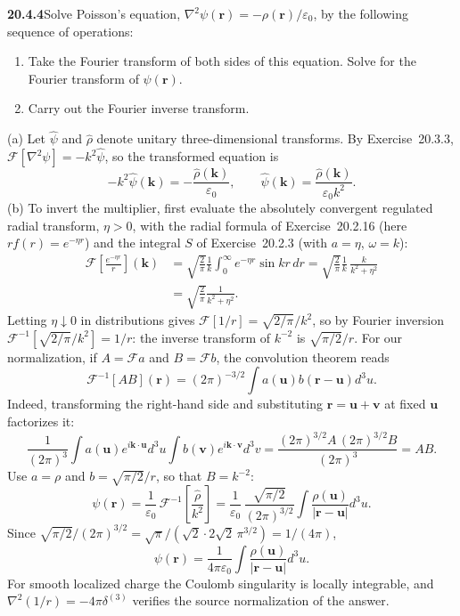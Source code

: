 \par\bigskip
\noindent\textbf{20.4.4}\quad Solve Poisson's equation,
$\nabla^{2}\psi(\mathbf{r})=-\rho(\mathbf{r})/\varepsilon_{0}$, by
the following sequence of operations:
\begin{enumerate}
\item[(a)] Take the Fourier transform of both sides of this
equation. Solve for the Fourier transform of $\psi(\mathbf{r})$.
\item[(b)] Carry out the Fourier inverse transform.
\end{enumerate}
\par{}
\solution
(a) Let $\widehat\psi$ and $\widehat\rho$ denote
unitary three-dimensional transforms. By Exercise~20.3.3,
$\mathcal F[\nabla^2\psi]=-k^2\widehat\psi$, so the transformed
equation is
\[
-k^2\widehat\psi(\mathbf k)=-\frac{\widehat\rho(\mathbf k)}{\varepsilon_0},
\qquad
\widehat\psi(\mathbf k)=\frac{\widehat\rho(\mathbf k)}{\varepsilon_0k^2}.
\]
(b) To invert the multiplier, first evaluate the absolutely
convergent regulated radial transform, $\eta>0$, with the radial
formula of Exercise~20.2.16 (here $rf(r)=e^{-\eta r}$) and the
integral $S$ of Exercise~20.2.3 (with $a=\eta$, $\omega=k$):
\begin{align*}
\mathcal F\left[\frac{e^{-\eta r}}r\right](\mathbf k)
&=\sqrt{\frac2\pi}\frac1k\int_0^\infty e^{-\eta r}\sin kr\,dr
=\sqrt{\frac2\pi}\frac1k\,\frac{k}{k^2+\eta^2}\\
&=\sqrt{\frac2\pi}\frac1{k^2+\eta^2}.
\end{align*}
Letting $\eta\downarrow0$ in distributions gives
$\mathcal F[1/r]=\sqrt{2/\pi}/k^2$, so by Fourier inversion
$\mathcal F^{-1}[\sqrt{2/\pi}/k^2]=1/r$: the
inverse transform of $k^{-2}$ is $\sqrt{\pi/2}/r$.
For our normalization, if $A=\mathcal Fa$ and $B=\mathcal Fb$, the
convolution theorem reads
\[
\mathcal F^{-1}[AB](\mathbf r)
=(2\pi)^{-3/2}\int a(\mathbf u)b(\mathbf r-\mathbf u)d^3u.
\]
Indeed, transforming the right-hand side and substituting
$\mathbf r=\mathbf u+\mathbf v$ at fixed $\mathbf u$ factorizes it:
\[
\frac1{(2\pi)^3}\int a(\mathbf u)e^{i\mathbf k\cdot\mathbf u}d^3u
\int b(\mathbf v)e^{i\mathbf k\cdot\mathbf v}d^3v
=\frac{(2\pi)^{3/2}A\,(2\pi)^{3/2}B}{(2\pi)^3}=AB.
\]
Use $a=\rho$ and $b=\sqrt{\pi/2}/r$, so that $B=k^{-2}$:
\[
\psi(\mathbf r)=\frac1{\varepsilon_0}\,
\mathcal F^{-1}\!\left[\frac{\widehat\rho}{k^2}\right]
=\frac1{\varepsilon_0}\,\frac{\sqrt{\pi/2}}{(2\pi)^{3/2}}
\int\frac{\rho(\mathbf u)}{|\mathbf r-\mathbf u|}d^3u.
\]
Since
$\sqrt{\pi/2}/(2\pi)^{3/2}=\sqrt\pi/(\sqrt2\cdot2\sqrt2\,\pi^{3/2})
=1/(4\pi)$,
\[
\boxed{\psi(\mathbf r)=\frac1{4\pi\varepsilon_0}
\int\frac{\rho(\mathbf u)}{|\mathbf r-\mathbf u|}d^3u}.
\]
For smooth localized charge the Coulomb singularity is locally
integrable, and $\nabla^2(1/r)=-4\pi\delta^{(3)}$ verifies the
source normalization of the answer.

